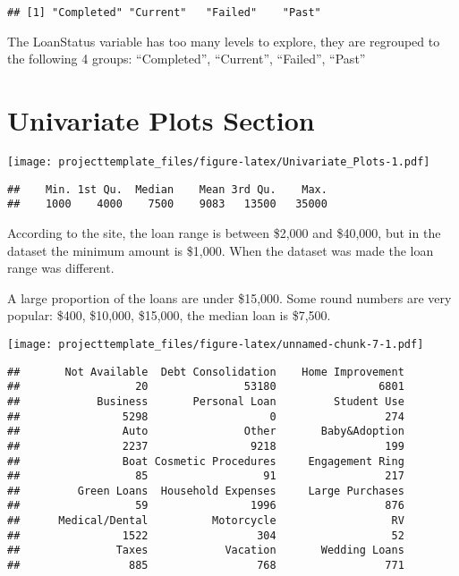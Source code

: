 \documentclass[]{article}
\begin{document}
\begin{verbatim}
## [1] "Completed" "Current"   "Failed"    "Past"
\end{verbatim}

The LoanStatus variable has too many levels to explore, they are
regrouped to the following 4 groups: ``Completed'', ``Current'',
``Failed'', ``Past''

\section{Univariate Plots Section}\label{univariate-plots-section}

\texttt{[image: projecttemplate\_files/figure-latex/Univariate\_Plots-1.pdf]}

\begin{verbatim}
##    Min. 1st Qu.  Median    Mean 3rd Qu.    Max. 
##    1000    4000    7500    9083   13500   35000
\end{verbatim}

According to the site, the loan range is between \$2,000 and \$40,000,
but in the dataset the minimum amount is \$1,000. When the dataset was
made the loan range was different.

A large proportion of the loans are under \$15,000. Some round numbers
are very popular: \$400, \$10,000, \$15,000, the median loan is \$7,500.

\texttt{[image: projecttemplate\_files/figure-latex/unnamed-chunk-7-1.pdf]}

\begin{verbatim}
##       Not Available  Debt Consolidation    Home Improvement 
##                  20               53180                6801 
##            Business       Personal Loan         Student Use 
##                5298                   0                 274 
##                Auto               Other       Baby&Adoption 
##                2237                9218                 199 
##                Boat Cosmetic Procedures     Engagement Ring 
##                  85                  91                 217 
##         Green Loans  Household Expenses     Large Purchases 
##                  59                1996                 876 
##      Medical/Dental          Motorcycle                  RV 
##                1522                 304                  52 
##               Taxes            Vacation       Wedding Loans 
##                 885                 768                 771
\end{verbatim}
\end{document}
